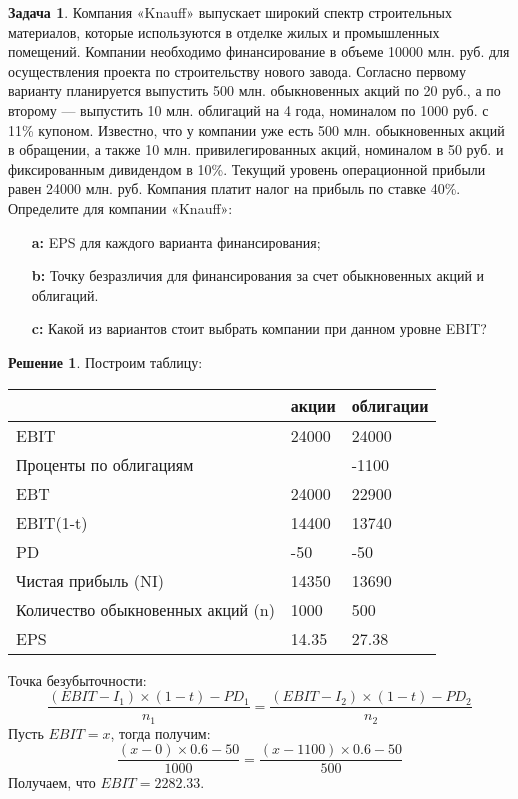 \documentclass[a4paper, 14pt]{article}
\theoremstyle{plain} %
\theoremstyle{definition} %
\newtheorem*{solution}{Решение}
\newtheorem{problem}{Задача}[subsection]
\theoremstyle{remark} %
\begin{document}
\begin{problem}
	Компания  «Knauff»  выпускает широкий спектр строительных материалов,  которые используются в отделке жилых и промышленных помещений. Компании необходимо финансирование в объеме  10000  млн.  руб.  для осуществления проекта по строительству нового завода. Согласно первому варианту планируется выпустить  500  млн.  обыкновенных акций по 20 руб., а по второму --- выпустить 10 млн. облигаций на 4 года, номиналом по 1000 руб. с 11\% купоном. Известно, что у компании уже есть 500 млн. обыкновенных акций в обращении, а также 10 млн. привилегированных акций, номиналом в 50 руб. и фиксированным дивидендом в 10\%. Текущий уровень операционной прибыли равен 24000 млн. руб. Компания платит налог на прибыль по ставке 40\%. Определите для компании «Knauff»:
	\begin{itemize}
		\item[\textbf{a:}] EPS для каждого варианта финансирования;
		\item[\textbf{b:}] Точку безразличия для финансирования за счет обыкновенных акций и облигаций.
		\item[\textbf{c:}] Какой из вариантов стоит выбрать компании при данном уровне EBIT?
	\end{itemize}
	\begin{solution} Построим таблицу:
\begin{center}
\begin{tabular}{|l|l|l|}
\hline
                                  & акции & облигации  \\
\hline
EBIT                              & 24000 & 24000      \\
\hline
Проценты по облигациям            &       & -1100      \\
\hline
EBT                               & 24000 & 22900      \\
\hline
EBIT(1-t)                         & 14400 & 13740      \\
\hline
PD                                & -50   & -50        \\
\hline
Чистая прибыль (NI)               & 14350 & 13690      \\
\hline
Количество обыкновенных акций (n) & 1000  & 500        \\
\hline
EPS                               & 14.35 & 27.38      \\
\hline
\end{tabular}
\end{center}
Точка безубыточности:
\[
	\frac{(EBIT - I_1) \times (1-t) - PD_1}{n_1} = \frac{(EBIT - I_2) \times (1-t) - PD_2}{n_2}
\]
Пусть $EBIT=x$, тогда получим:
\[
	\frac{(x - 0) \times 0.6 - 50}{1000} = \frac{(x - 1100) \times 0.6 - 50}{500}
\]
Получаем, что $EBIT = 2282.33$.
	\end{solution}
\end{problem}
\end{document}
